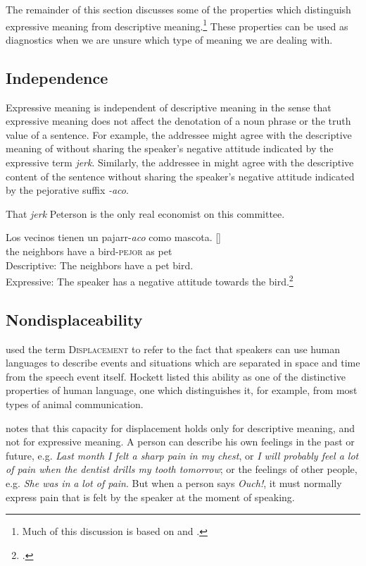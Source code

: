 \largerpage
The remainder of this section discusses some of the properties which distinguish expressive meaning from descriptive meaning.\footnote{Much of this discussion is based on \citet{Cruse1986,Cruse2000} and \citet{Potts2007c}.} These properties can be used as diagnostics when we are unsure which type of meaning we are dealing with.


\subsection{Independence}\label{sec:2.6.1}

Expressive meaning is independent of descriptive meaning in the sense that expressive meaning does not affect the denotation of a noun phrase or the truth value of a sentence. For example, the addressee might agree with the descriptive meaning of  without sharing the speaker’s negative attitude indicated by the expressive term \textit{jerk}. Similarly, the addressee in  might agree with the descriptive content of the sentence without sharing the speaker’s negative attitude indicated by the pejorative suffix \textit{-aco}.


\ea \label{ex:2.15}
That \textit{jerk} Peterson is the only real economist on this committee.
\z

\ea \label{ex:2.16}
\gll Los  vecinos  tienen  un  pajarr-\textit{aco}  como  mascota.  []\\
the  neighbors  have  a  bird-\textsc{pejor}  as  pet\\
\glt Descriptive: The neighbors have a pet bird.\\
Expressive: The speaker has a negative attitude towards the bird.\footnote{\citet{Fortin2011}.}
\z

\subsection{Nondisplaceability}\label{sec:2.6.2}

\citet{Hockett1958,Hockett1960} used the term \textsc{Displacement} to refer to the fact that speakers can use human languages to describe events and situations which are separated in space and time from the speech event itself. Hockett listed this ability as one of the distinctive properties of human language, one which distinguishes it, for example, from most types of animal communication.



\citet[272]{Cruse1986} notes that this capacity for displacement holds only for descriptive meaning, and not for expressive meaning. A person can describe his own feelings in the past or future, e.g. \textit{Last month I felt a sharp pain in my chest}, or \textit{I will probably feel a lot of pain when the dentist drills my tooth tomorrow}; or the feelings of other people, e.g. \textit{She was in} \textit{a lot of pain}. But when a person says \textit{Ouch!}, it must normally express pain that is felt by the speaker at the moment of speaking.


